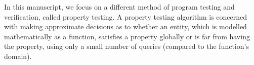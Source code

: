 In this manuscript, we focus on a different method of program testing and verification, called property testing. A property testing algorithm is concerned with making approximate decisions as to whether an entity, which is modelled mathematically as a function, satisfies a property globally or is far from having the property, using only a small number of queries (compared to the function's domain).


